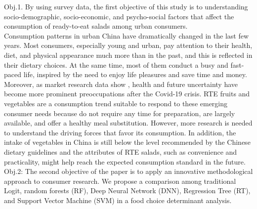 \documentclass[a4,12pt]{article}
\begin{document}
Obj.1. By using survey data, the first objective of this study is to understanding socio-demographic, socio-economic, and psycho-social factors that affect the consumption of ready-to-eat salads among urban consumers.\\

Consumption patterns in urban China have dramatically changed in the last few years. Most consumers, especially young and urban, pay attention to their health, diet, and physical appearance much more than in the past, and this is reflected in their dietary choices. At the same time, most of them conduct a busy and fast-paced life, inspired by the need to enjoy life pleasures and save time and money. 
Moreover, as market research data show \cite{DaxueConsulting21}, health and future uncertainty have become more prominent preoccupations after the Covid-19 crisis. RTE fruits and vegetables are a consumption trend suitable to respond to these emerging consumer needs because do not require any time for preparation, are largely available, and offer a healthy meal substitution.  However, more research is needed to understand the driving forces that favor its consumption. In addition, the intake of vegetables in China is still below the level recommended by the Chinese dietary guidelines \cite{Xiao15} and the attributes of RTE salads, such as convenience and practicality, might help reach the expected consumption standard in the future. \\

Obj.2: The second objective of the paper is to apply an innovative methodological approach to consumer research. We propose a comparison among traditional Logit, random forests (RF), Deep Neural Network (DNN), Regression Tree (RT), and Support Vector Machine (SVM) in a food choice determinant analysis.\\
\end{document}

